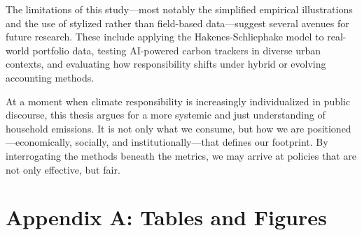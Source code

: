 \documentclass[12pt,a4paper]{article}%
\begin{document}
The limitations of this study—most notably the simplified empirical illustrations and the use of stylized rather than field-based data—suggest several avenues for future research. These include applying the Hakenes-Schliephake model to real-world portfolio data, testing AI-powered carbon trackers in diverse urban contexts, and evaluating how responsibility shifts under hybrid or evolving accounting methods.

At a moment when climate responsibility is increasingly individualized in public discourse, this thesis argues for a more systemic and just understanding of household emissions. It is not only what we consume, but how we are positioned—economically, socially, and institutionally—that defines our footprint. By interrogating the methods beneath the metrics, we may arrive at policies that are not only effective, but fair.

\newpage

\appendix
\section*{Appendix A: Tables and Figures}

\renewcommand{\thetable}{A\arabic{table}}
\renewcommand{\thefigure}{A\arabic{figure}}
\setcounter{table}{0}
\setcounter{figure}{0}
\end{document}
